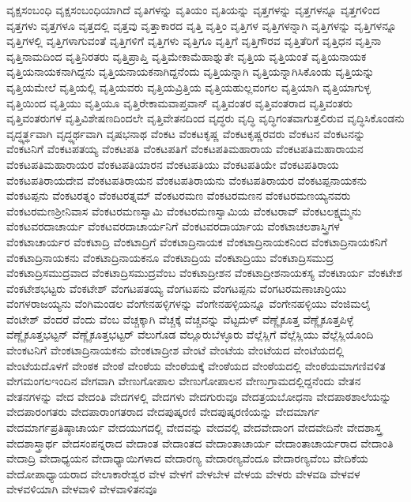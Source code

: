 {ವೃಕ್ಷಸಂಬಂಧಿ
ವೃಕ್ಷಸಂಬಂಧಿಯಾಗಿದೆ
ವೃತಿಗಳನ್ನು
ವೃತಿಯಂ
ವೃತಿಯನ್ನು
ವೃತ್ತಗಳನ್ನು
ವೃತ್ತಗಳನ್ನೂ
ವೃತ್ತಗಳಿಂದ
ವೃತ್ತಗಳು
ವೃತ್ತಗಳೂ
ವೃತ್ತದಲ್ಲಿ
ವೃತ್ತವು
ವೃತ್ತಾಕಾರದ
ವೃತ್ತಿ
ವೃತ್ತಿಂ
ವೃತ್ತಿಗಳ
ವೃತ್ತಿಗಳನ್ನಾಗಿ
ವೃತ್ತಿಗಳನ್ನು
ವೃತ್ತಿಗಳನ್ನೂ
ವೃತ್ತಿಗಳಲ್ಲಿ
ವೃತ್ತಿಗಳಾಗುವಂತೆ
ವೃತ್ತಿಗಳಿಗೆ
ವೃತ್ತಿಗಳು
ವೃತ್ತಿಗೂ
ವೃತ್ತಿಗೆ
ವೃತ್ತಿಗೌರವ
ವೃತ್ತಿತೆರಿಗೆ
ವೃತ್ತಿಧನ
ವೃತ್ತಿನಾ
ವೃತ್ತಿನಾಮದಿಂದ
ವೃತ್ತಿನಿರತರು
ವೃತ್ತಿಪ್ರಾಪ್ತಿ
ವೃತ್ತಿಮೇಕಾಮೆಹಾಶ್ನುತೇ
ವೃತ್ತಿಯ
ವೃತ್ತಿಯಂತೆ
ವೃತ್ತಿಯನಾಯಕ
ವೃತ್ತಿಯನಾಯಕನಾಗಿದ್ದನು
ವೃತ್ತಿಯನಾಯಕನಾಗಿದ್ದನೆಂದು
ವೃತ್ತಿಯನ್ನಾಗಿ
ವೃತ್ತಿಯನ್ನಾಗಿಸಿಕೊಂಡು
ವೃತ್ತಿಯನ್ನು
ವೃತ್ತಿಯಮೇಲೆ
ವೃತ್ತಿಯಲ್ಲಿ
ವೃತ್ತಿಯವರು
ವೃತ್ತಿಯವ್ರಿತ್ತಿಯ
ವೃತ್ತಿಯಹುಲ್ಲವಂಗಲ
ವೃತ್ತಿಯಾಗಿ
ವೃತ್ತಿಯಾಗುಳ್ಳ
ವೃತ್ತಿಯಿಂದ
ವೃತ್ತಿಯು
ವೃತ್ತಿಯೂ
ವೃತ್ತಿರೇಕಾಮವಾಪ್ತವಾನ್
ವೃತ್ತಿವಂತರ
ವೃತ್ತಿವಂತರಾದ
ವೃತ್ತಿವಂತರು
ವೃತ್ತಿವಂತರುಗಳ
ವೃತ್ತಿವಿಶೇಷಣದಿಂದಲೇ
ವೃತ್ತಿವೇತನದಿಂದ
ವೃದ್ಧರು
ವೃದ್ಧಿ
ವೃದ್ಧಿಗಂತವಾಗುತ್ತಲಿರುವ
ವೃದ್ಧಿಸಿಕೊಂಡನು
ವೃದ್ಧ್ಯರ್ತ್ಥವಾಗಿ
ವೃದ್ಧ್ಯರ್ಥವಾಗಿ
ವೃಷಭನಾಥ
ವೆಂಕಟ
ವೆಂಕಟಕೃಷ್ಣ
ವೆಂಕಟಕೃಷ್ಣರವರು
ವೆಂಕಟನ
ವೆಂಕಟನನ್ನು
ವೆಂಕಟನಿಗೆ
ವೆಂಕಟಪತಯ್ಯ
ವೆಂಕಟಪತಿ
ವೆಂಕಟಪತಿಗೆ
ವೆಂಕಟಪತಿಮಹಾರಾಯ
ವೆಂಕಟಪತಿಮಹಾರಾಯನ
ವೆಂಕಟಪತಿಮಹಾರಾಯರ
ವೆಂಕಟಪತಿಯಾರನ
ವೆಂಕಟಪತಿಯು
ವೆಂಕಟಪತಿಯೇ
ವೆಂಕಟಪತಿರಾಯ
ವೆಂಕಟಪತಿರಾಯದೇವ
ವೆಂಕಟಪತಿರಾಯನ
ವೆಂಕಟಪತಿರಾಯನು
ವೆಂಕಟಪತಿರಾಯರ
ವೆಂಕಟಪ್ಪನಾಯಕನು
ವೆಂಕಟಪ್ಪನು
ವೆಂಕಟರತ್ನಂ
ವೆಂಕಟರತ್ನಮ್
ವೆಂಕಟರಮಣ
ವೆಂಕಟರಮಣನ
ವೆಂಕಟರಮಣಯ್ಯನವರು
ವೆಂಕಟರಮಣಶ್ರೀನಿವಾಸ
ವೆಂಕಟರಮಣಸ್ವಾಮಿ
ವೆಂಕಟರಮಣಸ್ವಾಮಿಯ
ವೆಂಕಟರಾವ್
ವೆಂಕಟಲಕ್ಷ್ಮಮ್ಮನು
ವೆಂಕಟವರದಾಚಾರ್ಯ
ವೆಂಕಟವರದಾಚಾರ್ಯನಿಗೆ
ವೆಂಕಟವರದಾರ್ಯಾಯ
ವೆಂಕಟಾಚಲಶಾಸ್ತ್ರಿಗಳ
ವೆಂಕಟಾಚಾರ್ಯರ
ವೆಂಕಟಾದ್ರಿ
ವೆಂಕಟಾದ್ರಿಗೆ
ವೆಂಕಟಾದ್ರಿನಾಯಕ
ವೆಂಕಟಾದ್ರಿನಾಯಕನಿಂದ
ವೆಂಕಟಾದ್ರಿನಾಯಕನಿಗೆ
ವೆಂಕಟಾದ್ರಿನಾಯಕನು
ವೆಂಕಟಾದ್ರಿನಾಯಕನೂ
ವೆಂಕಟಾದ್ರಿಯ
ವೆಂಕಟಾದ್ರಿಯು
ವೆಂಕಟಾದ್ರಿಸಮುದ್ರ
ವೆಂಕಟಾದ್ರಿಸಮುದ್ರವಾದ
ವೆಂಕಟಾದ್ರಿಸಮುದ್ರವೆಂಬ
ವೆಂಕಟಾದ್ರೀಶನ
ವೆಂಕಟಾದ್ರೀಶನಾಯಕಸ್ಯ
ವೆಂಕಟಾರ್ಯ
ವೆಂಕಟೇಶ
ವೆಂಕಟೇಶಭಟ್ಟರು
ವೆಂಕಟೇಶ್
ವೆಂಗಟಪತಯ್ಯ
ವೆಂಗಟಪನು
ವೆಂಗಟಪ್ಪನು
ವೆಂಗಟರಮಣಾಚಾರ್ರಿಯು
ವೆಂಗಳರಾಜಯ್ಯನು
ವೆಂಗಿಮಂಡಲ
ವೆಂಗೇನಹಳ್ಳಿಗಳನ್ನು
ವೆಂಗೇನಹಳ್ಳಿಯನ್ನೂ
ವೆಂಗೇನಹಳ್ಳಿಯು
ವೆಂಜಿಮಲೈ
ವೆಂಟೇಶ್
ವೆಂದರೆ
ವೆಂದು
ವೆಂಬ
ವೆಚ್ಚಕ್ಕಾಗಿ
ವೆಚ್ಚಕ್ಕೆ
ವೆಚ್ಚವನ್ನು
ವೆಟ್ಟದುಳ್
ವೆಣ್ಣೈಕೂತ್ತ
ವೆಣ್ಣೈಕೂತ್ತಪಿಳ್ಳೆ
ವೆಣ್ಣೈಕೂತ್ತಭಟ್ಟನ್
ವೆಣ್ಣೈಕೂತ್ತಭಟ್ಟರ್
ವೆಲುಗೊಡ
ವೆಲ್ಲೂರುಬೆಳ್ಳೂರು
ವೆಲ್ಲೆಸ್ಲಿಗೆ
ವೆಲ್ಲೆಸ್ಲಿಯು
ವೆಲ್ಲೆಸ್ಲಿಯೊಂದಿ
ವೇಂಕಟನಿಗೆ
ವೇಂಕಟಾದ್ರಿನಾಯಕನು
ವೇಂಕಟಾದ್ರೀಶ
ವೇಂಟೆ
ವೇಂಟೆಯ
ವೇಂಟೆಯದ
ವೇಂಟೆಯದಲ್ಲಿ
ವೇಂಟೆಯದೊಳಗೆ
ವೇಂಠಕ
ವೇಂಠೆ
ವೇಂಠೆಯ
ವೇಂಠೆಯಕ್ಕೆ
ವೇಂಠೆಯದ
ವೇಂಠೆಯದಲ್ಲಿ
ವೇಂಠೆಯಮಾಗಣಿವಳಿತ
ವೇಗಮಂಗಲಇಂದಿನ
ವೇಗವಾಗಿ
ವೇಣುಗೋಪಾಲ
ವೇಣುಗೋಪಾಲನ
ವೇಣುಗ್ರಾಮದಲ್ಲಿದ್ದನೆಂದು
ವೇತನ
ವೇತನಗಳನ್ನು
ವೇದ
ವೇದಂತಿ
ವೇದಗಳಲ್ಲಿ
ವೇದಗಳು
ವೇದಗುರುವೂ
ವೇದತ್ರಯಬೋಧನಾ
ವೇದಪಾಠಶಾಲೆಯನ್ನು
ವೇದಪಾರಂಗತರು
ವೇದಪಾರಾಂಗತರಾದ
ವೇದಪುಷ್ಕರಣಿ
ವೇದಪುಷ್ಕರಣಿಯನ್ನು
ವೇದಮಾರ್ಗ
ವೇದಮಾರ್ಗಪ್ರತಿಷ್ಠಾಚಾರ್ಯ
ವೇದಯುಗದಲ್ಲಿ
ವೇದವನ್ನು
ವೇದವಲ್ಲಿ
ವೇದವೇದಾಂಗ
ವೇದವೇದಿನೇ
ವೇದಶಾಸ್ತ್ರ
ವೇದಶಾಸ್ತ್ರಾರ್ಥ
ವೇದಸಂಪನ್ನರಾದ
ವೇದಾಂತ
ವೇದಾಂತದ
ವೇದಾಂತಾಚಾರ್ಯ
ವೇದಾಂತಾಚಾರ್ಯರಾದ
ವೇದಾಂತಿ
ವೇದಾದ್ರಿ
ವೇದಾಧ್ಯಯನ
ವೇದಾಧ್ಯಾಯಿಗಳಾದ
ವೇದಾರಣ್ಯ
ವೇದಾರಣ್ಯವೆಂದೂ
ವೇದಾರಣ್ಯವೆಂಬ
ವೇದಿಕೆಯ
ವೇದೋಪಾಧ್ಯಾಯರಾದ
ವೇಲಾಕಾರೇಶ್ವರ
ವೇಳ
ವೇಳಗೆ
ವೇಳಬೇಳ
ವೇಳಯ
ವೇಳರು
ವೇಳವಡಿ
ವೇಳವಳ
ವೇಳವಳಿಯಾಗಿ
ವೇಳವಾಳಿ
ವೇಳವಾಳಿತನವೂ
}
